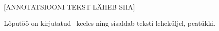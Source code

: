 [ANNOTATSIOONI TEKST LÄHEB SIIA]



Lõputöö on kirjutatud \langEst~keeles ning sisaldab teksti \calculatepages leheküljel, 
 peatükki.
